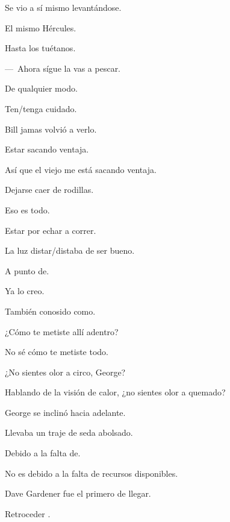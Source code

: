 \sk
Se vio a sí mismo levantándose. 

\sk
El mismo Hércules. 

\sk
Hasta los tuétanos. 

\sk
---~Ahora sígue la vas a pescar. 

\sk
De qualquier modo. 

\sk
Ten/tenga cuidado. 

\sk
Bill jamas volvió a verlo. 

\sk
Estar sacando ventaja. 

\sk
Así que el viejo me está sacando ventaja. 

\sk
Dejarse caer de rodillas. 

\sk
Eso es todo. 

\sk
Estar por echar a correr. 

\sk
La luz distar/distaba de ser bueno. 

\sk
A punto de. 

\sk
Ya lo creo. 

\sk
También conosido como. 

\sk
¿Cómo te metiste allí adentro? 

\sk
No sé cómo te metiste todo. 

\sk
¿No sientes olor a circo, George? \nb{}

\sk
Hablando de la visión de calor, ¿no sientes olor a quemado? 

\sk
George se inclinó hacia adelante. \nb{}

\sk
Llevaba un traje de seda abolsado. 

\sk
Debido a la falta de. 

\sk
No es debido a la falta de recursos disponibles. 

\sk
Dave Gardener fue el primero de llegar. 

\sk
Retroceder . 

